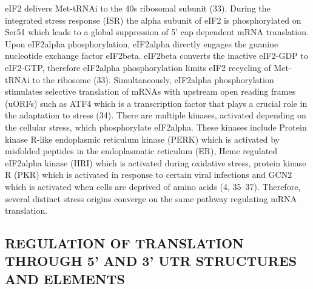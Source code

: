 \documentclass[12pt,openany]{book}
\begin{document}
eIF2 delivers Met-tRNAi to the 40s ribosomal subunit (33). During the
integrated stress response (ISR) the alpha subunit of eIF2 is
phosphorylated on Ser51 which leads to a global suppression of 5' cap
dependent mRNA translation. Upon eIF2alpha phosphorylation, eIF2alpha
directly engages the guanine nucleotide exchange factor eIF2beta.
eIF2beta converts the inactive eIF2-GDP to eIF2-GTP, therefore eIF2alpha
phosphorylation limits eIF2 recycling of Met-tRNAi to the ribosome (33).
Simultaneously, eIF2alpha phosphorylation stimulates selective
translation of mRNAs with upstream open reading frames (uORFs) such as
ATF4 which is a transcription factor that plays a crucial role in the
adaptation to stress (34). There are multiple kinases, activated
depending on the cellular stress, which phosphorylate eIF2alpha. These
kinases include Protein kinase R-like endoplasmic reticulum kinase
(PERK) which is activated by misfolded peptides in the endoplasmatic
reticulum (ER), Heme regulated eIF2alpha kinase (HRI) which is activated
during oxidative stress, protein kinase R (PKR) which is activated in
response to certain viral infections and GCN2 which is activated when
cells are deprived of amino acids (4, 35--37). Therefore, several
distinct stress origins converge on the same pathway regulating mRNA
translation.

\subsection{REGULATION OF TRANSLATION THROUGH 5’ AND 3’ UTR STRUCTURES AND ELEMENTS}
\end{document}
